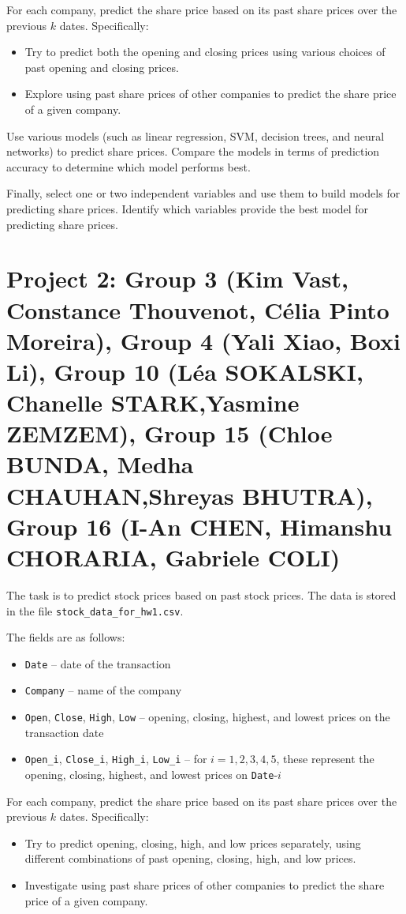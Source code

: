 \documentclass{article}
\begin{document}
For each company, predict the share price based on its past share prices over the previous $k$ dates. Specifically: 
\begin{itemize} 
\item Try to predict both the opening and closing prices using various choices of past opening and closing prices. 
\item Explore using past share prices of other companies to predict the share price of a given company. 
\end{itemize}

Use various models (such as linear regression, SVM, decision trees, and neural networks) to predict share prices. Compare the models in terms of prediction accuracy to determine which model performs best.

Finally, select one or two independent variables and use them to build models for predicting share prices. Identify which variables provide the best model for predicting share prices.



\section*{Project 2:  Group 3 (Kim Vast, Constance Thouvenot, Célia Pinto Moreira), Group 4 (Yali Xiao,
Boxi Li),  Group 10 (Léa SOKALSKI, Chanelle STARK,Yasmine ZEMZEM), Group 15 (Chloe BUNDA, Medha	CHAUHAN,Shreyas	BHUTRA),
Group 16 (I-An CHEN, Himanshu CHORARIA, Gabriele COLI)
}
The task is to predict stock prices based on past stock prices. The data is stored in the file \lstinline$stock_data_for_hw1.csv$.

The fields are as follows: \begin{itemize} \item \lstinline$Date$ -- date of the transaction \item \lstinline$Company$ -- name of the company \item \lstinline$Open$, \lstinline$Close$, \lstinline$High$, \lstinline$Low$ -- opening, closing, highest, and lowest prices on the transaction date \item \lstinline$Open_i$, \lstinline$Close_i$, \lstinline$High_i$, \lstinline$Low_i$ -- for $i=1,2,3,4,5$, these represent the opening, closing, highest, and lowest prices on \lstinline$Date$-$i$ \end{itemize}

For each company, predict the share price based on its past share prices over the previous $k$ dates. Specifically: \begin{itemize} \item Try to predict opening, closing, high, and low prices separately, using different combinations of past opening, closing, high, and low prices. \item Investigate using past share prices of other companies to predict the share price of a given company. \end{itemize}
\end{document}
